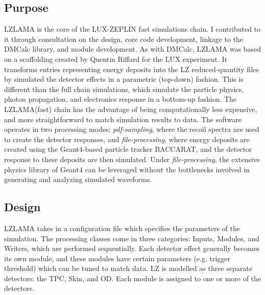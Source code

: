\subsection{Purpose}
LZLAMA is the core of the LUX-ZEPLIN fast simulations chain.
I contributed to it through consultation on the design, core code development, linkage to the DMCalc library, and module development.
As with DMCalc, LZLAMA was based on a scaffolding created by Quentin Riffard for the LUX experiment.
It transforms entries representing energy deposits into the LZ reduced-quantity files by simulated the detector effects in a parametric (top-down) fashion.
This is different than the full chain simulations, which simulate the particle physics, photon propagation, and electronics response in a bottom-up fashion.
The LZLAMA(fast) chain has the advantage of being computationally less expensive, and more straightforward to match simulation results to data.
The software operates in two processing modes: \textit{pdf-sampling}, where the recoil spectra are used to create the detector responses, and \textit{file-processing}, where  energy deposits are created using the Geant4-based particle tracker BACCARAT, and the detector response to these deposits are then simulated.
Under \textit{file-processing}, the extensive physics library of Geant4 can be leveraged without the bottlenecks involved in generating and analyzing simulated waveforms.

\subsection{Design}

LZLAMA takes in a configuration file which specifies the parameters of the simulation.
The processing classes come in three categories: Inputs, Modules, and Writers, which are performed sequentially.
Each detector effect generally becomes its own module, and these modules have certain parameters (e.g. trigger threshold) which can be tuned to match data.
LZ is modelled as three separate detectors: the TPC, Skin, and OD.
Each module is assigned to one or more of the detectors.

